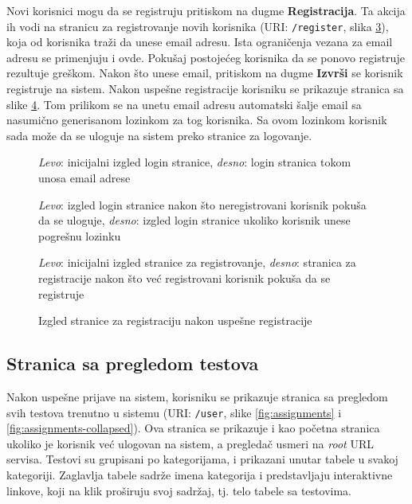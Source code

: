 Novi korisnici mogu da se registruju pritiskom na dugme \textbf{Registracija}. Ta akcija ih vodi na stranicu za registrovanje novih korisnika (URI: \texttt{/register}, slika \ref{fig:register}), koja od korisnika traži da unese email adresu. Ista ograničenja vezana za email adresu se primenjuju i ovde. Pokušaj postojećeg korisnika da se ponovo registruje rezultuje greškom. Nakon što unese email, pritiskom na dugme \textbf{Izvrši} se korisnik registruje na sistem. Nakon uspešne registracije korisniku se prikazuje stranica sa slike \ref{fig:register-success}. Tom prilikom se na unetu email adresu automatski šalje email sa nasumično generisanom lozinkom za tog korisnika. Sa ovom lozinkom korisnik sada može da se uloguje na sistem preko stranice za logovanje.
\begin{figure}[p]
\centering
{}
\caption{\textit{Levo}: inicijalni izgled login stranice, \textit{desno}: login stranica tokom unosa email adrese}
\label{fig:login}
\end{figure}
\begin{figure}[p]
\centering
{}
\caption{\textit{Levo}: izgled login stranice nakon što neregistrovani korisnik pokuša da se uloguje, \textit{desno}: izgled login stranice ukoliko korisnik unese pogrešnu lozinku}
\label{fig:login-error}
\end{figure}
\begin{figure}[p]
\centering
{}
\caption{\textit{Levo}: inicijalni izgled stranice za registrovanje, \textit{desno}: stranica za registracije nakon što već registrovani korisnik pokuša da se registruje}
\label{fig:register}
\end{figure}
\begin{figure}[h]
\centering
{}
\caption{Izgled stranice za registraciju nakon uspešne registracije}
\label{fig:register-success}
\end{figure}

\subsection{Stranica sa pregledom testova}
Nakon uspešne prijave na sistem, korisniku se prikazuje stranica sa pregledom svih testova trenutno u sistemu (URI: \texttt{/user}, slike \ref{fig:assignments} i \ref{fig:assignments-collapsed}). Ova stranica se prikazuje i kao početna stranica ukoliko je korisnik već ulogovan na sistem, a pregledač usmeri na \textit{root} URL servisa. Testovi su grupisani po kategorijama, i prikazani unutar tabele u svakoj kategoriji. Zaglavlja tabele sadrže imena kategorija i predstavljaju interaktivne linkove, koji na klik proširuju svoj sadržaj, tj. telo tabele sa testovima.

